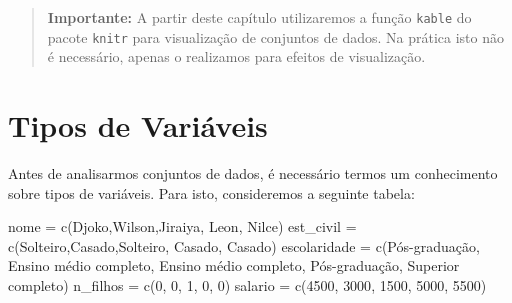 \documentclass[
]{book}
\newenvironment{Shaded}{\begin{snugshade}}{\end{snugshade}}
\newcommand{\DecValTok}[1]{\textcolor[rgb]{0.00,0.00,0.81}{#1}}
\newcommand{\FunctionTok}[1]{\textcolor[rgb]{0.00,0.00,0.00}{#1}}
\newcommand{\NormalTok}[1]{#1}
\newcommand{\OtherTok}[1]{\textcolor[rgb]{0.56,0.35,0.01}{#1}}
\newcommand{\StringTok}[1]{\textcolor[rgb]{0.31,0.60,0.02}{#1}}
\begin{document}
\begin{quote}
\textbf{Importante:} A partir deste capítulo utilizaremos a função \texttt{kable} do pacote \texttt{knitr} para visualização de conjuntos de dados. Na prática isto não é necessário, apenas o realizamos para efeitos de visualização.
\end{quote}

\hypertarget{tipos-de-variuxe1veis}{%
\section{Tipos de Variáveis}\label{tipos-de-variuxe1veis}}

Antes de analisarmos conjuntos de dados, é necessário termos um conhecimento sobre tipos de variáveis. Para isto, consideremos a seguinte tabela:

\begin{Shaded}
\begin{Highlighting}[]
\NormalTok{nome }\OtherTok{=} \FunctionTok{c}\NormalTok{(}\StringTok{\textquotesingle{}Djoko\textquotesingle{}}\NormalTok{,}\StringTok{\textquotesingle{}Wilson\textquotesingle{}}\NormalTok{,}\StringTok{\textquotesingle{}Jiraiya\textquotesingle{}}\NormalTok{, }\StringTok{\textquotesingle{}Leon\textquotesingle{}}\NormalTok{, }\StringTok{\textquotesingle{}Nilce\textquotesingle{}}\NormalTok{)}
\NormalTok{est\_civil }\OtherTok{=} \FunctionTok{c}\NormalTok{(}\StringTok{\textquotesingle{}Solteiro\textquotesingle{}}\NormalTok{,}\StringTok{\textquotesingle{}Casado\textquotesingle{}}\NormalTok{,}\StringTok{\textquotesingle{}Solteiro\textquotesingle{}}\NormalTok{, }\StringTok{\textquotesingle{}Casado\textquotesingle{}}\NormalTok{, }\StringTok{\textquotesingle{}Casado\textquotesingle{}}\NormalTok{)}
\NormalTok{escolaridade }\OtherTok{=} \FunctionTok{c}\NormalTok{(}\StringTok{\textquotesingle{}Pós{-}graduação\textquotesingle{}}\NormalTok{,}
                 \StringTok{\textquotesingle{}Ensino médio completo\textquotesingle{}}\NormalTok{,}
                 \StringTok{\textquotesingle{}Ensino médio completo\textquotesingle{}}\NormalTok{,}
                 \StringTok{\textquotesingle{}Pós{-}graduação\textquotesingle{}}\NormalTok{,}
                 \StringTok{\textquotesingle{}Superior completo\textquotesingle{}}\NormalTok{)}
\NormalTok{n\_filhos }\OtherTok{=} \FunctionTok{c}\NormalTok{(}\DecValTok{0}\NormalTok{, }\DecValTok{0}\NormalTok{, }\DecValTok{1}\NormalTok{, }\DecValTok{0}\NormalTok{, }\DecValTok{0}\NormalTok{)}
\NormalTok{salario }\OtherTok{=} \FunctionTok{c}\NormalTok{(}\DecValTok{4500}\NormalTok{, }\DecValTok{3000}\NormalTok{, }\DecValTok{1500}\NormalTok{, }\DecValTok{5000}\NormalTok{, }\DecValTok{5500}\NormalTok{)}

\end{Highlighting}
\end{Shaded}
\end{document}
